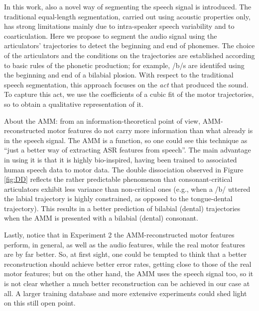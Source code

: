 In this work, also a novel way of segmenting the speech signal is introduced.
The traditional equal-length segmentation, carried out using acoustic properties
only, has strong limitations mainly due to intra-speaker speech variability and
to coarticulation. Here we propose to segment the audio signal using the articulators'
trajectories to detect the beginning and end of phonemes. The choice of the articulators
and the conditions on the trajectories are established according to basic rules of
the phonetic production; for example, /b/s are identifed using the beginning and end of
a bilabial plosion. With respect to the traditional speech segmentation, this approach
focuses on the \emph{act} that produced the sound. To capture this act, we use the
coefficients of a cubic fit of the motor trajectories, so to obtain a qualitative
representation of it.

About the AMM: from an information-theoretical point of view, AMM-reconstructed
motor features do not carry more information than what already is in the speech signal.
The AMM is a function, so one could see this technique as
``just a better way of extracting ASR features from speech''.
The main advantage in using it is that it is highly bio-inspired,
having been trained to associated human speech data to motor data. The double dissociation
observed in Figure \ref{fig:DD} reflects the rather predictable phenomenon
that consonant-critical articulators exhibit less variance than non-critical ones (e.g.,
when a /b/ uttered the labial trajectory is highly constrained, as opposed to the tongue-dental
trajectory). This results in a better prediction of bilabial (dental) trajectories when the
AMM is presented with a bilabial (dental) consonant.

Lastly, notice that in Experiment 2 the AMM-reconstructed motor features perform, in general,
as well as the audio features, while the real motor features are by far better. So, at first
sight, one could be tempted to think that a better reconstruction should achieve better error
rates, getting close to those of the real motor features;
but on the other hand, the AMM uses the speech signal too, so it is not clear
whether a much better reconstruction can be achieved in our case at all. A larger training
database and more extensive experiments could shed light on this still open point.
